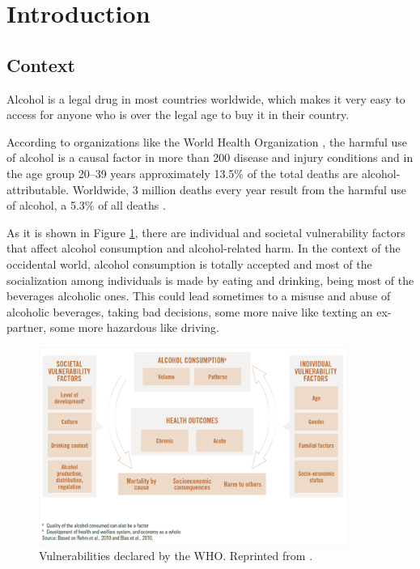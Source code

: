 \section{Introduction}

\subsection{Context}

Alcohol is a legal drug in most countries worldwide, which makes it very easy to access for anyone who is over the legal age to buy it in their country.

According to organizations like the World Health Organization \cite{who}, the harmful use of alcohol is a causal factor in more than 200 disease and injury conditions and in the age group 20–39 years approximately 13.5\% of the total deaths are alcohol-attributable. Worldwide, 3 million deaths every year result from the harmful use of alcohol, a 5.3\% of all deaths \cite{whoalcohol}.

As it is shown in Figure \ref{vulnerabilities}, there are individual and societal vulnerability factors \cite{whoalcohol} that affect alcohol consumption and alcohol-related harm. In the context of the occidental world, alcohol consumption is totally accepted and most of the socialization among individuals is made by eating and drinking, being most of the beverages alcoholic ones. This could lead sometimes to a misuse and abuse of alcoholic beverages, taking bad decisions, some more naive like texting an ex-partner, some more hazardous like driving.

\begin{figure}[H]
    \centering
    \includegraphics[width=0.9\textwidth]{./img/vulnerabilities.png}
    \caption{Vulnerabilities declared by the WHO. Reprinted from \cite{who}.}
    \label{vulnerabilities}
\end{figure}

